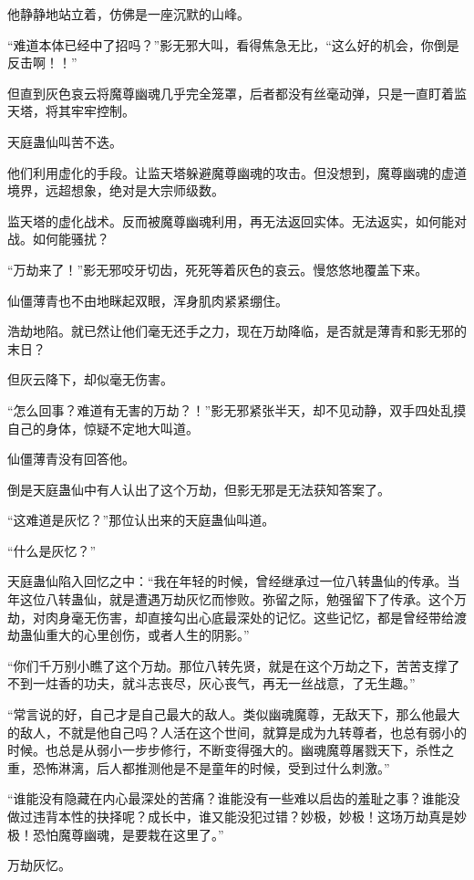 \begin{this_body}
他静静地站立着，仿佛是一座沉默的山峰。

“难道本体已经中了招吗？”影无邪大叫，看得焦急无比，“这么好的机会，你倒是反击啊！！”

但直到灰色哀云将魔尊幽魂几乎完全笼罩，后者都没有丝毫动弹，只是一直盯着监天塔，将其牢牢控制。

天庭蛊仙叫苦不迭。

他们利用虚化的手段。让监天塔躲避魔尊幽魂的攻击。但没想到，魔尊幽魂的虚道境界，远超想象，绝对是大宗师级数。

监天塔的虚化战术。反而被魔尊幽魂利用，再无法返回实体。无法返实，如何能对战。如何能骚扰？

“万劫来了！”影无邪咬牙切齿，死死等着灰色的哀云。慢悠悠地覆盖下来。

仙僵薄青也不由地眯起双眼，浑身肌肉紧紧绷住。

浩劫地陷。就已然让他们毫无还手之力，现在万劫降临，是否就是薄青和影无邪的末日？

但灰云降下，却似毫无伤害。

“怎么回事？难道有无害的万劫？！”影无邪紧张半天，却不见动静，双手四处乱摸自己的身体，惊疑不定地大叫道。

仙僵薄青没有回答他。

倒是天庭蛊仙中有人认出了这个万劫，但影无邪是无法获知答案了。

“这难道是灰忆？”那位认出来的天庭蛊仙叫道。

“什么是灰忆？”

天庭蛊仙陷入回忆之中：“我在年轻的时候，曾经继承过一位八转蛊仙的传承。当年这位八转蛊仙，就是遭遇万劫灰忆而惨败。弥留之际，勉强留下了传承。这个万劫，对肉身毫无伤害，却直接勾出心底最深处的记忆。这些记忆，都是曾经带给渡劫蛊仙重大的心里创伤，或者人生的阴影。”

“你们千万别小瞧了这个万劫。那位八转先贤，就是在这个万劫之下，苦苦支撑了不到一炷香的功夫，就斗志丧尽，灰心丧气，再无一丝战意，了无生趣。”

“常言说的好，自己才是自己最大的敌人。类似幽魂魔尊，无敌天下，那么他最大的敌人，不就是他自己吗？人活在这个世间，就算是成为九转尊者，也总有弱小的时候。也总是从弱小一步步修行，不断变得强大的。幽魂魔尊屠戮天下，杀性之重，恐怖淋漓，后人都推测他是不是童年的时候，受到过什么刺激。”

“谁能没有隐藏在内心最深处的苦痛？谁能没有一些难以启齿的羞耻之事？谁能没做过违背本性的抉择呢？成长中，谁又能没犯过错？妙极，妙极！这场万劫真是妙极！恐怕魔尊幽魂，是要栽在这里了。”

万劫灰忆。


\end{this_body}

